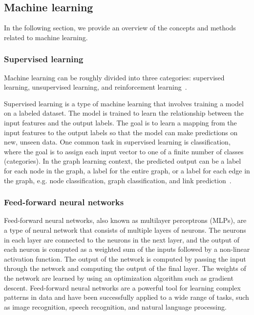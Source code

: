 \documentclass{article}
\begin{document}
\subsection{Machine learning}
In the following section, we provide an overview of the concepts and methods related to machine learning. 

\subsubsection{Supervised learning}
Machine learning can be roughly divided into three categories: supervised learning, unsupervised learning, and reinforcement learning~\cite{bishop2006pattern}.

Supervised learning is a type of machine learning that involves training a model on a labeled dataset. The model is trained to learn the relationship between the input features and the output labels. The goal is to learn a mapping from the input features to the output labels so that the model can make predictions on new, unseen data. One common task in supervised learning is classification, where the goal is to assign each input vector to one of a finite number of classes (categories). In the graph learning context, the predicted output can be a label for each node in the graph, a label for the entire graph, or a label for each edge in the graph, e.g. node classification, graph classification, and link prediction~\cite{velivckovic2023everything}.

\subsubsection{Feed-forward neural networks}

Feed-forward neural networks, also known as multilayer perceptrons (MLPs), are a type of neural network that consists of multiple layers of neurons. The neurons in each layer are connected to the neurons in the next layer, and the output of each neuron is computed as a weighted sum of the inputs followed by a non-linear activation function. The output of the network is computed by passing the input through the network and computing the output of the final layer. The weights of the network are learned by using an optimization algorithm such as gradient descent. Feed-forward neural networks are a powerful tool for learning complex patterns in data and have been successfully applied to a wide range of tasks, such as image recognition, speech recognition, and natural language processing.
\end{document}

